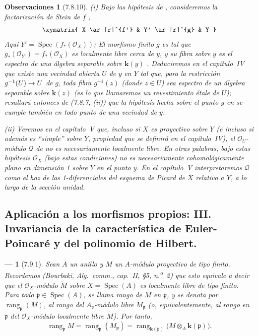 \documentclass[10pt,oneside,openany]{book}
\theoremstyle{egaenv}\newtheorem*{env}{---}
\theoremstyle{egastatement}
\theoremstyle{egadescription}
\newtheorem*{remarks}{Observaciones}
\newcommand{\oldpage}[2][]{\marginnote{\normalfont\scriptsize\textbf{#1}\,|\,#2}\ignorespaces}
\renewcommand{\to}{\mathchoice{\longrightarrow}{\rightarrow}{\rightarrow}{\rightarrow}}
\begin{document}
\begin{remarks}[7.8.10]
\label{III.7.8.10}
\textnormal{(i)}
Bajo las hipótesis de , consideremos la
factorización de Stein de $f$ ,
\[
\xymatrix{
  X \ar[r]^{f'} & Y' \ar[r]^{g} & Y
}
\]
\oldpage[III]{208}
Aquí
$Y'=\operatorname{Spec}(f_*(\mathscr O_X))$;
El morfismo finito $g$ es tal que
$g_*(\mathscr O_{Y'})=f_*(\mathscr O_X)$
es localmente libre cerca de $y$, y su fibra sobre $y$ es el
espectro de una álgebra separable sobre $\boldsymbol{k}(y)$
. Deduciremos en el capítulo~IV que existe una
vecindad abierta $U$ de $y$ en $Y$ tal que, para la restricción
$g^{-1}(U)\to U$ de $g$, \emph{toda} fibra $g^{-1}(z)$ (donde $z\in U$) sea espectro de un álgebra separable sobre $\boldsymbol{k}(z)$ (es lo que llamaremos un \emph{revestimiento étale} de $U$); resultará entonces de (7.8.7, (ii)) que la hipótesis hecha sobre el punto $y$ en  se cumple también
en todo punto de una vecindad de $y$.

\medskip
\textnormal{(ii)}
Veremos en el capítulo~V que, incluso si $X$ es proyectivo sobre $Y$
(e incluso si además es ``simple'' sobre $Y$, propiedad que se
definirá en el capítulo~IV), el $\mathscr O_U$-módulo $\mathscr Q$
de  no es necesariamente localmente libre. En otras
palabras, bajo estas hipótesis $\mathscr O_X$ (bajo estas
condiciones) no es necesariamente cohomológicamente plano en \emph{dimensión
1} sobre $Y$ en el
punto $y$. En el capítulo~V interpretaremos $\mathscr Q$ como el
haz de las 1-diferenciales del esquema de Picard de $X$ relativo a
$Y$, a lo largo de la sección unidad.
\end{remarks}

\subsection{Aplicación a los morfismos propios: III. Invariancia de la
característica de Euler-Poincaré y del polinomio de Hilbert.}
\label{subsection:III.7.9}
\label{subsection:III.7.9.fr}
\label{III.7.9}
\label{III.7.9.fr}

\begin{env}[7.9.1]
\label{III.7.9.1}
\label{III.7.9.1.fr}
Sean $A$ un anillo y $M$ un $A$-módulo proyectivo de tipo finito.
Recordemos (Bourbaki, \emph{Alg.~comm.}, cap.~II, \S5, n.\textsuperscript{o}~2)
que esto equivale a decir que el $\mathscr O_X$-módulo $\widetilde M$ sobre
$X=\operatorname{Spec}(A)$ es localmente libre de tipo finito.
Para todo $\mathfrak p\in\operatorname{Spec}(A)$, se llama \emph{rango de $M$ en
$\mathfrak p$}, y se denota por $\operatorname{rang}_{\mathfrak p}(M)$,
al rango del $A_{\mathfrak p}$-módulo libre $M_{\mathfrak p}$ (o,
equivalentemente, al rango en $\mathfrak p$ del $\mathscr O_X$-módulo
localmente libre $\widetilde M$). Por tanto,
\[
  \operatorname{rang}_{\mathfrak p}M
  =\operatorname{rang}_{\mathfrak p}(M_{\mathfrak p})
  =\operatorname{rang}_{\mathbf{k}(\mathfrak p)}
  \bigl(M\otimes_A\boldsymbol{k}(\mathfrak p)\bigr).
  \tag{7.9.1.1}\label{III.7.9.1.1.fr}
\]
\end{env}
\end{document}
